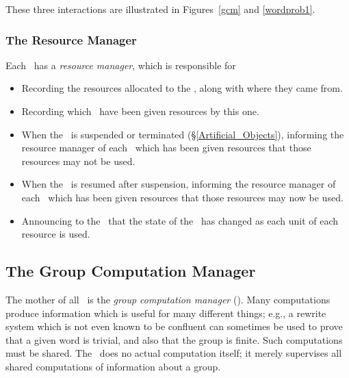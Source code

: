 These three interactions are illustrated in Figures~\ref{gcm}
and \ref{wordprob1}.


\subsubsection{The Resource Manager}\label{resource_manager}

Each \CM\ has a {\em resource manager}, which is responsible for

\begin{itemize}

\item
Recording the resources allocated to the \CM, along with where they
came from.

\item
Recording which \CMs\ have been given resources by this one.

\item
When the \CM\ is suspended or terminated (\S\ref{Artificial_Objects}),
informing the resource manager of each \CM\ which has been given
resources that those resources may not be used.

\item
When the \CM\ is resumed after suspension, informing the resource
manager of each \CM\ which has been given resources that those
resources may now be used.

\item
Announcing to the \FE\ that the state of the \CM\ has changed as each
unit of each resource is used.

\end{itemize}


\subsection{The Group Computation Manager}

The mother of all \CMs\ is the {\em group computation manager}
(\GCM). Many computations produce information which is useful for many
different things; e.g., a rewrite system which is not even known to be
confluent can sometimes be used to prove that a given word is trivial,
and also that the group is finite. Such computations must be shared.
The \GCM\ does no actual computation itself; it merely supervises all
shared computations of information about a group.

